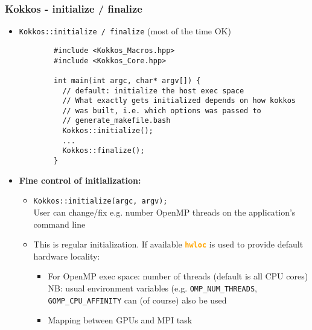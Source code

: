 \begin{frame}[fragile=singleslide]
  \frametitle{Kokkos - initialize / finalize}

  \begin{itemize}
  \item \texttt{Kokkos::initialize / finalize} (most of the time OK)
    {\small\begin{verbatim}
        #include <Kokkos_Macros.hpp>
        #include <Kokkos_Core.hpp>
        
        int main(int argc, char* argv[]) {
          // default: initialize the host exec space
          // What exactly gets initialized depends on how kokkos
          // was built, i.e. which options was passed to
          // generate_makefile.bash
          Kokkos::initialize();
          ...
          Kokkos::finalize();
        }
      \end{verbatim}
    }
  \item \textbf{Fine control of initialization:}
    \begin{itemize}
    \item \texttt{Kokkos::initialize(argc, argv);}\\
      User can change/fix e.g. number OpenMP threads on the application's command line
    \item This is regular initialization. If available \textcolor{orange}{\textbf{\texttt{hwloc}}} is used to provide default hardware locality:
      \begin{itemize}
      \item For OpenMP exec space: number of threads (default is all CPU cores)\\
        NB: usual environment variables (e.g. \texttt{OMP\_NUM\_THREADS}, \texttt{GOMP\_CPU\_AFFINITY} can (of course) also be used
      \item Mapping between GPUs and MPI task
      \end{itemize}
    \end{itemize}
  \end{itemize}
  
\end{frame}



